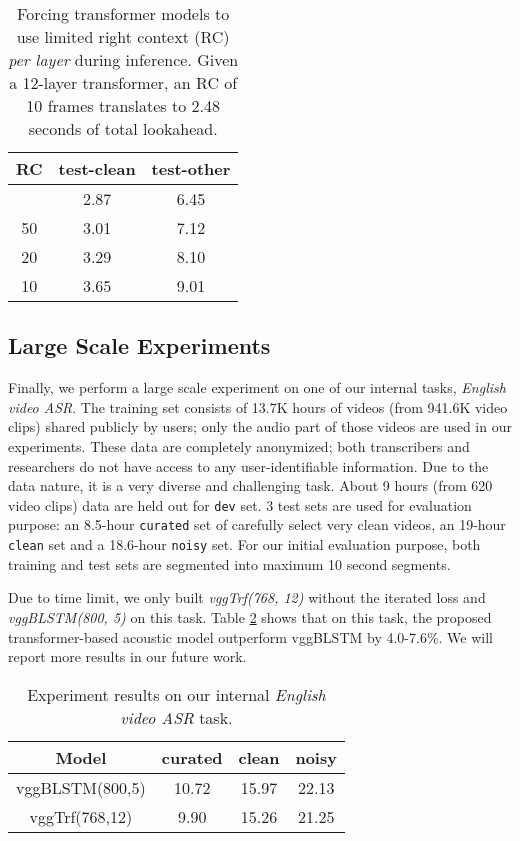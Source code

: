 \documentclass{article}
\begin{document}
\begin{table}[tb]
    \centering
    \caption{Forcing transformer models to use limited right context (RC) \emph{per layer} during inference. Given a 12-layer transformer, an RC of 10 frames translates to 2.48 seconds of total lookahead.}
    \begin{tabular}{|c||cc|}
    \hline
    RC & test-clean & test-other \\ 
    \hline
     & 2.87 & 6.45 \\
    50       & 3.01 & 7.12 \\
    20       & 3.29 & 8.10 \\
    10       & 3.65 & 9.01 \\
    \hline
    \end{tabular}
    \label{tab:rc}
\end{table}
\vspace{-0.5em}

\subsection{Large Scale Experiments}
\vspace{-0.5em}
Finally, we perform a large scale experiment on one of our internal tasks, \emph{English video ASR}. The training set consists of 13.7K hours of videos (from 941.6K video clips) shared publicly by users; only the audio part of those videos are used in our experiments. These data are completely anonymized; both transcribers and researchers do not have access to any user-identifiable information. Due to the data nature, it is a very diverse and challenging task.  About 9 hours (from 620 video clips) data are held out for \texttt{dev} set. 3 test sets are used for evaluation purpose: an 8.5-hour \texttt{curated} set of carefully select very clean videos, an 19-hour \texttt{clean} set and a 18.6-hour \texttt{noisy} set. For our initial evaluation purpose, both training and test sets are segmented into maximum 10 second segments. 

Due to time limit, we only built \textit{vggTrf(768, 12)} without the iterated loss and \textit{vggBLSTM(800, 5)} on this task. Table \ref{tab:video_asr} shows that on this task, the proposed transformer-based acoustic model outperform vggBLSTM by 4.0-7.6\%. We will report more results in our future work.  
\vspace{-1em}

\begin{table}[htb]
    \centering
    \caption{Experiment results on our internal \emph{English video ASR} task.}
    \begin{tabular}{|c|ccc|}
    \hline
    Model     & curated & clean & noisy  \\
    \hline\hline
    vggBLSTM(800,5) & 10.72 & 15.97 & 22.13 \\
    vggTrf(768,12) &  9.90 &  15.26 & 21.25 \\
    \hline
    \end{tabular}
    \label{tab:video_asr}
\end{table}
\vspace{-1em}
\end{document}
